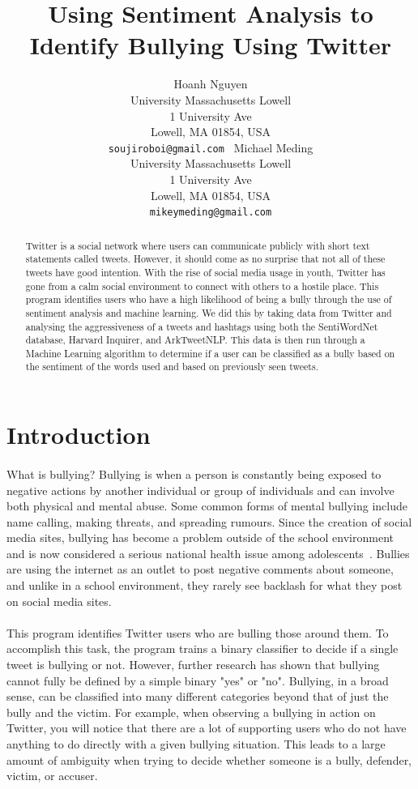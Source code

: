 \documentclass[11pt,letterpaper]{article}
\title{
Using Sentiment Analysis to Identify Bullying Using Twitter
    }
\author{Hoanh Nguyen\\
	    University Massachusetts Lowell\\
	     1 University Ave\\
	     Lowell, MA 01854, USA\\
	    {\tt soujiroboi@gmail.com }
	  \And
	Michael Meding\\
  	University Massachusetts Lowell\\
	     1 University Ave\\
	     Lowell, MA 01854, USA\\
  {\tt mikeymeding@gmail.com}}
\date{}
\begin{document}
\maketitle
\begin{abstract}
  Twitter is a social network where users can communicate publicly with short text statements called tweets. However, it should come as no surprise that not all of these tweets have good intention. With the rise of social media usage in youth, Twitter has gone from a calm social environment to connect with others to a hostile place. This program identifies users who have a high likelihood of being a bully through the use of sentiment analysis and machine learning. We did this by taking data from Twitter and analysing the aggressiveness of a tweets and hashtags using both the SentiWordNet database, Harvard Inquirer, and ArkTweetNLP. This data is then run through a Machine Learning algorithm to determine if a user can be classified as a bully based on the sentiment of the words used and based on previously seen tweets.
\end{abstract}

\section{Introduction}
\paragraph{}
What is bullying? Bullying is when a person is constantly being exposed to negative actions by another individual or group of individuals and can involve both physical and mental abuse. Some common forms of mental bullying include name calling, making threats, and spreading rumours. Since the creation of social media sites, bullying has become a problem outside of the school environment and is now considered a serious national health issue among adolescents~\cite{SentiBullying}. Bullies are using the internet as an outlet to post negative comments about someone, and unlike in a school environment, they rarely see backlash for what they post on social media sites.
\paragraph{}
This program identifies Twitter users who are bulling those around them. To accomplish this task, the program trains a binary classifier to decide if a single tweet is bullying or not. However, further research has shown that bullying cannot fully be defined by a simple binary "yes" or "no". Bullying, in a broad sense, can be classified into many different categories beyond that of just the bully and the victim. For example, when observing a bullying in action on Twitter, you will notice that there are a lot of supporting users who do not have anything to do directly with a given bullying situation. This leads to a large amount of ambiguity when trying to decide whether someone is a bully, defender, victim, or accuser.
\end{document}
